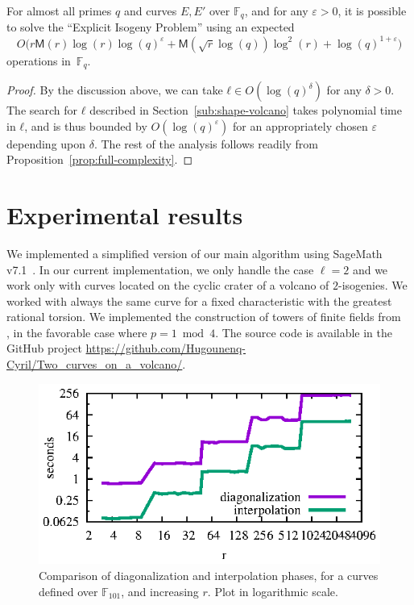 \documentclass{lms}
\def\cout#1{\mathsf{#1}}
\newcommand{\F}{\mathbb{F}}
\newcommand{\MM}{\cout{M}}
\begin{document}
\begin{thm*}
  For almost all primes $q$ and curves $E,E'$ over $\F_q$, and for any
  $ε>0$, it is possible to solve the “Explicit Isogeny Problem” using
  an expected
  \[O\bigl(r\MM(r)\log(r)\log(q)^ε + \MM(\sqrt{r}\log(q))\log^2(r) +
    \log(q)^{1+ε}\bigr)\]
  operations in~$\F_q$.
\end{thm*}
\begin{proof}
  By the discussion above, we can take $ℓ∈O(\log(q)^δ)$ for any $δ>0$.
  The search for $ℓ$ described in Section~\ref{sub:shape-volcano}
  takes polynomial time in $ℓ$, and is thus bounded by $O(\log(q)^ε)$
  for an appropriately chosen $ε$ depending upon $δ$.  The rest of the
  analysis follows readily from
  Proposition~\ref{prop:full-complexity}.
\end{proof}


\section{Experimental results}
\label{sec:implem}


We implemented a simplified version of our main algorithm using
SageMath v7.1~\cite{sage}. In our current implementation, we only
handle the case $\ell=2$ and we work only with curves located on the
cyclic crater of a volcano of $2$-isogenies. We worked with always the
same curve for a fixed characteristic with the greatest rational torsion.
We implemented the construction of towers of finite fields from~\cite{DoSc12}
, in the favorable case where $p = 1 \bmod 4$. The source code is available in
the GitHub project
\url{https://github.com/Hugounenq-Cyril/Two_curves_on_a_volcano/}.

\begin{figure}%
\centering
\includegraphics[scale=1]{benchmarks/graphe-101.eps}
\caption{Comparison of diagonalization and interpolation phases, for a
  curves defined over $\F_{101}$, and increasing $r$. Plot in logarithmic scale.}
\label{fig:p=101}
\end{figure}
\end{document}

